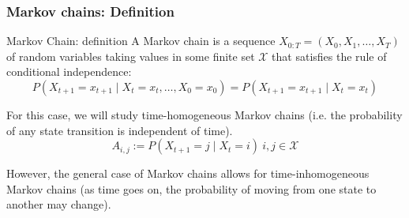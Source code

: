 \documentclass[xcolor=dvipsnames, compress]{beamer}
\begin{document}
\begin{frame}
\frametitle{Markov chains: Definition}

\begin{block}{Markov Chain: definition}
	A Markov chain is a sequence $X_{0:T}=\left(X_{0},X_{1},\ldots,X_{T}\right)$  of random variables taking values in some finite set $\mathcal{X}$ that satisfies the rule of conditional independence:
	\begin{equation*}
	{P}\left(X_{t+1}=x_{t+1}\mid X_{t}=x_{t},\ldots,X_{0}=x_{0}\right)= {P}\left(X_{t+1}=x_{t+1}\mid X_{t}=x_{t}\right)
	\end{equation*}	
\end{block}

For this case, we will study time-homogeneous Markov chains (i.e. the probability of any state transition is independent of time).\begin{equation*}
A_{i,j}:={P}\left(X_{t+1}=j\mid X_{t}=i\right)\:i,j\in\mathcal{X}
\end{equation*}

However, the general case of Markov chains allows for time-inhomogeneous Markov chains (as time goes on, the probability of moving from one state to another may change). 

\end{frame}
\end{document}
